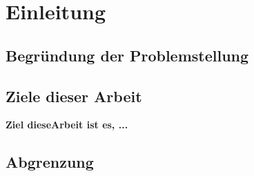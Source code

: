 \section{Einleitung}
\label{sec:einleitung}

\subsection{Begründung der Problemstellung}


\subsection{Ziele dieser Arbeit}

\textbf{Ziel dieseArbeit ist es, ...}

\subsection{Abgrenzung}

